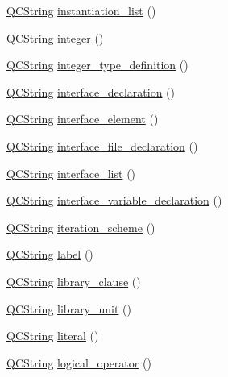 \begin{DoxyCompactItemize}
\hyperlink{class_q_c_string}{Q\+C\+String} \hyperlink{classvhdl_1_1parser_1_1_vhdl_parser_ad36a4e3924f0f3f9054f0654ae01d43e}{instantiation\+\_\+list} ()
\item 
\hyperlink{class_q_c_string}{Q\+C\+String} \hyperlink{classvhdl_1_1parser_1_1_vhdl_parser_ad8a4f0c5da87abb6410c63873921a31d}{integer} ()
\item 
\hyperlink{class_q_c_string}{Q\+C\+String} \hyperlink{classvhdl_1_1parser_1_1_vhdl_parser_a1fa81444e3a70d1b1983c40d14de1333}{integer\+\_\+type\+\_\+definition} ()
\item 
\hyperlink{class_q_c_string}{Q\+C\+String} \hyperlink{classvhdl_1_1parser_1_1_vhdl_parser_ae73cf5fc6036eb1164d6746f7c79bb63}{interface\+\_\+declaration} ()
\item 
\hyperlink{class_q_c_string}{Q\+C\+String} \hyperlink{classvhdl_1_1parser_1_1_vhdl_parser_a77559e479eedb3407b1bc50a4c4a9699}{interface\+\_\+element} ()
\item 
\hyperlink{class_q_c_string}{Q\+C\+String} \hyperlink{classvhdl_1_1parser_1_1_vhdl_parser_a4dc825d347bff54932ff0fa0cf150c23}{interface\+\_\+file\+\_\+declaration} ()
\item 
\hyperlink{class_q_c_string}{Q\+C\+String} \hyperlink{classvhdl_1_1parser_1_1_vhdl_parser_a4b08a7e8ab33fc76111c04fbd632bbe5}{interface\+\_\+list} ()
\item 
\hyperlink{class_q_c_string}{Q\+C\+String} \hyperlink{classvhdl_1_1parser_1_1_vhdl_parser_a2d4d0686f697e1b115caa1e05ea18ee4}{interface\+\_\+variable\+\_\+declaration} ()
\item 
\hyperlink{class_q_c_string}{Q\+C\+String} \hyperlink{classvhdl_1_1parser_1_1_vhdl_parser_a180c217d7993db0c1735a1319110f22f}{iteration\+\_\+scheme} ()
\item 
\hyperlink{class_q_c_string}{Q\+C\+String} \hyperlink{classvhdl_1_1parser_1_1_vhdl_parser_ac2b512bbedbcf86a2c7adce70478bbaa}{label} ()
\item 
\hyperlink{class_q_c_string}{Q\+C\+String} \hyperlink{classvhdl_1_1parser_1_1_vhdl_parser_ad62518c08241a32983b34f066636a352}{library\+\_\+clause} ()
\item 
\hyperlink{class_q_c_string}{Q\+C\+String} \hyperlink{classvhdl_1_1parser_1_1_vhdl_parser_af77d30d3b7968d2e1daeafd2322b3078}{library\+\_\+unit} ()
\item 
\hyperlink{class_q_c_string}{Q\+C\+String} \hyperlink{classvhdl_1_1parser_1_1_vhdl_parser_a03d03e38116457c239921868333096d5}{literal} ()
\item 
\hyperlink{class_q_c_string}{Q\+C\+String} \hyperlink{classvhdl_1_1parser_1_1_vhdl_parser_a2abf0d796343289eca384f9b4a8e12fd}{logical\+\_\+operator} ()

\end{DoxyCompactItemize}
